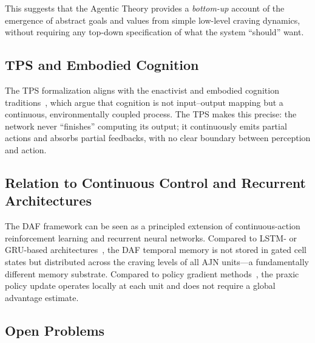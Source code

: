 \documentclass[12pt,a4paper]{article}
\begin{document}
This suggests that the Agentic Theory provides a \textit{bottom-up} account of
the emergence of abstract goals and values from simple low-level craving dynamics,
without requiring any top-down specification of what the system ``should'' want.

\subsection{TPS and Embodied Cognition}

The TPS formalization aligns with the enactivist and embodied cognition
traditions~\cite{varela1991embodied}, which argue that cognition is not input--output
mapping but a continuous, environmentally coupled process. The TPS makes this
precise: the network never ``finishes'' computing its output; it continuously
emits partial actions and absorbs partial feedbacks, with no clear boundary
between perception and action.

\subsection{Relation to Continuous Control and Recurrent Architectures}

The DAF framework can be seen as a principled extension of continuous-action
reinforcement learning and recurrent neural networks. Compared to LSTM- or
GRU-based architectures~\cite{hochreiter1997lstm}, the DAF temporal memory is
not stored in gated cell states but distributed across the craving levels of
all AJN units---a fundamentally different memory substrate. Compared to
policy gradient methods~\cite{williams1992reinforce}, the praxic policy update
operates locally at each unit and does not require a global advantage estimate.

\subsection{Open Problems}
\end{document}
